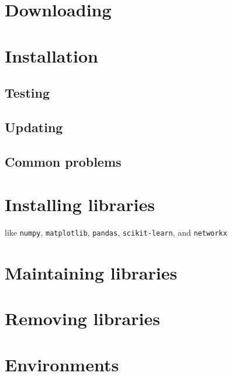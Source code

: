 \section{Downloading}

\section{Installation}

\subsection{Testing}

\subsection{Updating}

\subsection{Common problems}

\section{Installing libraries}
like \texttt{numpy}, \texttt{matplotlib}, \texttt{pandas}, \texttt{scikit-learn}, and \texttt{networkx}

\section{Maintaining libraries}

\section{Removing libraries}

\section{Environments}